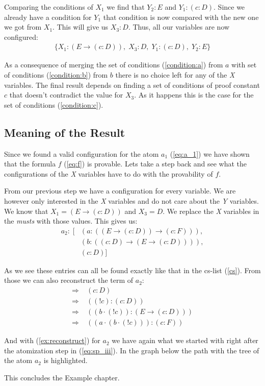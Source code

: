 Comparing the conditions of $X_1$ we find that $Y_2: E$ and $Y_1: (c:D)$. Since we already have a condition for $Y_1$ that condition is now compared with the new one we got from $X_1$. This will give us $X_3: D$. Thus, all our variables are now configured:
\begin{align}
	\{X_1: (E \rightarrow (c:D)), \; X_3: D, \; Y_1: (c:D), \; Y_2: E\}
\end{align}

As a consequence of merging the set of conditions (\ref{condition:a}) from $a$ with set of conditions (\ref{condition:b}) from $b$ there is no choice left for any of the \emph{X} variables. The final result depends on finding a set of conditions of proof constant $c$ that doesn't contradict the value for $X_3$. As it happens this is the case for the set of conditions (\ref{condition:c}).


\subsection{Meaning of the Result}
Since we found a valid configuration for the atom $a_1$ (\ref{eq:a_1}) we have shown that the formula $f$ (\ref{eq:f}) is provable. Lets take a step back and see what the configurations of the \emph{X} variables have to do with the provability of $f$.

From our previous step we have a configuration for every variable. We are however only interested in the \emph{X} variables and do not care about the \emph{Y} variables. We know that $X_1 = (E \rightarrow (c:D))$ and $X_3 = D$. We replace the \emph{X} variables in the \emph{musts} with those values. This gives us:
\begin{equation}
\begin{split}
	a_2: \; [&(a: ((E \rightarrow (c:D)) \rightarrow (c:F))), \\
	&(b: ((c:D) \rightarrow (E \rightarrow (c:D)))), \\
	&(c: D)]
\end{split}
\end{equation}

As we see these entries can all be found exactly like that in the cs-list (\ref{cs}). From those we can also reconstruct the term of $a_2$: 
\begin{align}
	\Rightarrow & \; (c:D) \\
	\Rightarrow & \; ((!c):(c:D)) \\
	\Rightarrow & \; ((b\cdot(!c)):(E \rightarrow (c:D)))\\
	\Rightarrow & \; ((a\cdot(b\cdot(!c))):(c:F)) \label{ex:reconstruct}
\end{align}

And with (\ref{ex:reconstruct}) for $a_2$ we have again what we started with right after the atomization step in (\ref{eq:sp_iii}). In the graph below the path with the tree of the atom $a_2$ is highlighted. 


This concludes the Example chapter. 